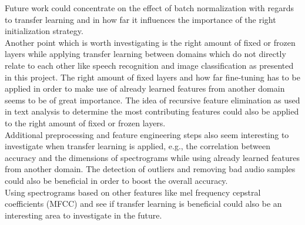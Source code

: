 \documentclass{article}
\theoremstyle{definition}
\theoremstyle{remark}
\begin{document}
Future work could concentrate on the effect of batch normalization with regards to transfer learning and in how far it influences the importance of the right initialization strategy.\\ 
Another point which is worth investigating is the right amount of fixed or frozen layers while applying transfer learning between domains which do not directly relate to each other like speech recognition and image classification as presented in this project. The right amount of fixed layers and how far fine-tuning has to be applied in order to make use of already learned features from another domain seems to be of great importance. The idea of recursive feature elimination as used in text analysis to determine the most contributing features could also be applied to the right amount of fixed or frozen layers.\\
Additional preprocessing and feature engineering steps also seem interesting to investigate when transfer learning is applied, e.g., the correlation between accuracy and the dimensions of spectrograms while using already learned features from another domain. The detection of outliers and removing bad audio samples could also be beneficial in order to boost the overall accuracy.\\
Using spectrograms based on other features like mel frequency cepstral coefficients (MFCC) and see if transfer learning is beneficial could also be an interesting area to investigate in the future.









\end{document}
